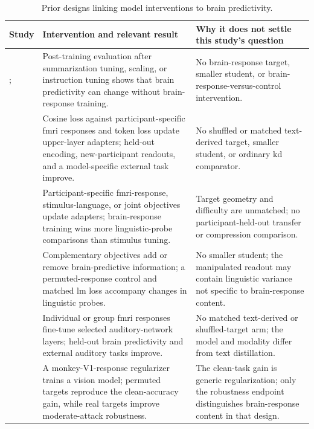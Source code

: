 \begin{table}[H]
  \centering
  \footnotesize
  \setlength{\tabcolsep}{3pt}
  \newcommand{\relatedarraystretch}{1.08}
  \renewcommand{\arraystretch}{\relatedarraystretch}
  \caption{Prior designs linking model interventions to brain predictivity.}
  \label{tab:related-designs}
  \begin{tabular}{@{}>{\raggedright\arraybackslash}p{27mm} >{\raggedright\arraybackslash}p{66mm} >{\raggedright\arraybackslash}p{59mm}@{}}
    \toprule
    Study & Intervention and relevant result & Why it does not settle this study's question \\
    \midrule
    \textcite{aw2023}; \textcite{gao2024} &
    Post-training evaluation after summarization tuning, scaling, or instruction tuning shows that brain predictivity can change without brain-response training. &
    No brain-response target, smaller student, or brain-response-versus-control intervention. \\
    \textcite{bilgin2026} &
    Cosine loss against participant-specific \ac{fmri} responses and token loss update upper-layer adapters; held-out encoding, new-participant readouts, and a model-specific external task improve. &
    No shuffled or matched text-derived target, smaller student, or ordinary \ac{kd} comparator. \\
    \textcite{merlinData2026} &
    Participant-specific \ac{fmri}-response, stimulus-language, or joint objectives update adapters; brain-response training wins more linguistic-probe comparisons than stimulus tuning. &
    Target geometry and difficulty are unmatched; no participant-held-out transfer or compression comparison. \\
    \textcite{merlin2026} &
    Complementary objectives add or remove brain-predictive information; a permuted-response control and matched \ac{lm} loss accompany changes in linguistic probes. &
    No smaller student; the manipulated readout may contain linguistic variance not specific to brain-response content. \\
    \textcite{freteault2025} &
    Individual or group \ac{fmri} responses fine-tune selected auditory-network layers; held-out brain predictivity and external auditory tasks improve. &
    No matched text-derived or shuffled-target arm; the model and modality differ from text distillation. \\
    \textcite{pirlot2022} &
    A monkey-V1-response regularizer trains a vision model; permuted targets reproduce the clean-accuracy gain, while real targets improve moderate-attack robustness. &
    The clean-task gain is generic regularization; only the robustness endpoint distinguishes brain-response content in that design. \\
    \bottomrule
  \end{tabular}
\end{table}


